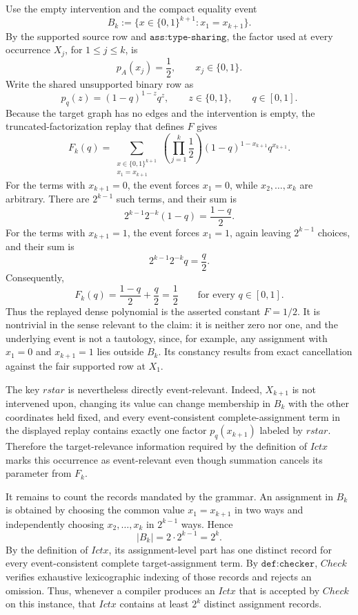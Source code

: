 Use the empty intervention and the compact equality event
\[
B_k:=\bigl\{x\in\{0,1\}^{k+1}:x_1=x_{k+1}\bigr\}.
\]
By the supported source row and \(\texttt{ass:type-sharing}\), the factor used at every occurrence \(X_j\), for \(1\leq j\leq k\), is
\[
p_A(x_j)=\frac12,
\qquad x_j\in\{0,1\}.
\]
Write the shared unsupported binary row as
\[
p_q(z)=(1-q)^{1-z}q^z,
\qquad z\in\{0,1\},\qquad q\in[0,1].
\]
Because the target graph has no edges and the intervention is empty, the truncated-factorization replay that defines \(F\) gives
\[
F_k(q)
=\sum_{\substack{x\in\{0,1\}^{k+1}\\x_1=x_{k+1}}}
  \left(\prod_{j=1}^{k}\frac12\right)
  (1-q)^{1-x_{k+1}}q^{x_{k+1}}.
\]
For the terms with \(x_{k+1}=0\), the event forces \(x_1=0\), while \(x_2,\ldots,x_k\) are arbitrary.  There are \(2^{k-1}\) such terms, and their sum is
\[
2^{k-1}2^{-k}(1-q)=\frac{1-q}{2}.
\]
For the terms with \(x_{k+1}=1\), the event forces \(x_1=1\), again leaving \(2^{k-1}\) choices, and their sum is
\[
2^{k-1}2^{-k}q=\frac q2.
\]
Consequently,
\[
F_k(q)=\frac{1-q}{2}+\frac q2=\frac12
\qquad\text{for every }q\in[0,1].
\]
Thus the replayed dense polynomial is the asserted constant \(F=1/2\).  It is nontrivial in the sense relevant to the claim: it is neither zero nor one, and the underlying event is not a tautology, since, for example, any assignment with \(x_1=0\) and \(x_{k+1}=1\) lies outside \(B_k\).  Its constancy results from exact cancellation against the fair supported row at \(X_1\).

The key \(rstar\) is nevertheless directly event-relevant.  Indeed, \(X_{k+1}\) is not intervened upon, changing its value can change membership in \(B_k\) with the other coordinates held fixed, and every event-consistent complete-assignment term in the displayed replay contains exactly one factor \(p_q(x_{k+1})\) labeled by \(rstar\).  Therefore the target-relevance information required by the definition of \(Ictx\) marks this occurrence as event-relevant even though summation cancels its parameter from \(F_k\).

It remains to count the records mandated by the grammar.  An assignment in \(B_k\) is obtained by choosing the common value \(x_1=x_{k+1}\) in two ways and independently choosing \(x_2,\ldots,x_k\) in \(2^{k-1}\) ways.  Hence
\[
|B_k|=2\cdot 2^{k-1}=2^k.
\]
By the definition of \(Ictx\), its assignment-level part has one distinct record for every event-consistent complete target-assignment term.  By \(\texttt{def:checker}\), \(Check\) verifies exhaustive lexicographic indexing of those records and rejects an omission.  Thus, whenever a compiler produces an \(Ictx\) that is accepted by \(Check\) on this instance, that \(Ictx\) contains at least \(2^k\) distinct assignment records.

